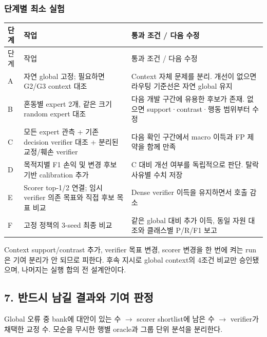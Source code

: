\subsubsection{단계별 최소 실험}
\begingroup
\footnotesize
\begin{longtable}{>{\raggedright\arraybackslash}p{}>{\raggedright\arraybackslash}p{}>{\raggedright\arraybackslash}p{}}
\toprule
단계 & 작업 & 통과 조건 /\allowbreak{} 다음 수정 \\ \midrule
\endfirsthead
단계 & 작업 & 통과 조건 /\allowbreak{} 다음 수정 \\ \midrule
\endhead
{}A & 자연 global 고정; 필요하면 G2/\allowbreak{}G3 context 대조 & Context 자체 문제를 분리. 개선이 없으면 라우팅 기준선은 자연 global 유지 \\
{}B & 혼동별 expert 2개, 같은 크기 random expert 대조 & 다음 개발 구간에 유용한 후보가 존재. 없으면 support·contrast·행동 범위부터 수정 \\
{}C & 모든 expert 관측 +\allowbreak{} 기존 decision verifier 대조 +\allowbreak{} 분리된 교정/\allowbreak{}훼손 verifier & 다음 확인 구간에서 macro 이득과 FP 제약을 함께 만족 \\
{}D & 목적지별 F1 손익 및 변경 후보 기반 calibration 추가 & C 대비 개선 여부를 독립적으로 판단. 탈락 사유별 수치 저장 \\
{}E & Scorer top-1/\allowbreak{}2 연결; 임시 verifier 의존 목표와 직접 후보 목표 비교 & Dense verifier 이득을 유지하면서 호출 감소 \\
{}F & 고정 정책의 3-seed 최종 비교 & 같은 global 대비 추가 이득, 동일 자원 대조와 클래스별 P/\allowbreak{}R/\allowbreak{}F1 보고 \\
\bottomrule
\end{longtable}
\endgroup
Context support/\allowbreak{}contrast 추가, verifier 목표 변경, scorer 변경을 한 번에 켜는 run은 기여 분리가 안 되므로 피한다. 후속 지시로 global context의 4조건 비교만 승인됐으며, 나머지는 실행 합의 전 설계안이다.

\subsection{7. 반드시 남길 결과와 기여 판정}
\par\noindent \textbullet\enspace Global 오류 중 bank에 대안이 있는 수  \ensuremath{\rightarrow}  scorer shortlist에 남은 수  \ensuremath{\rightarrow}  verifier가 채택한 교정 수. 모순을 무시한 행별 oracle과 그룹 단위 분석을 분리한다.


